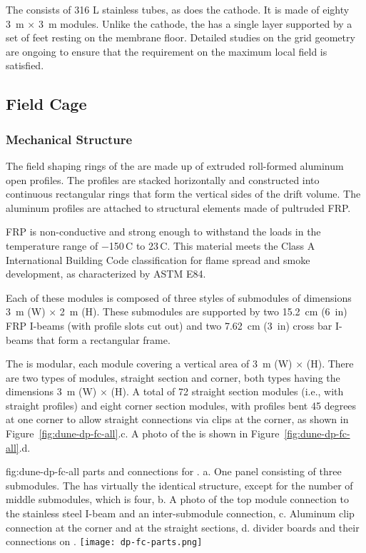 The  consists of 316 L stainless tubes, as does the cathode. It is made of eighty \SI{3}{\m} $\times$ \SI{3}{\m} modules. Unlike the cathode, the  has a single layer supported by a set of feet resting on the membrane floor.
Detailed studies on the grid geometry are ongoing to ensure that the requirement on the maximum local field is satisfied.

\subsection{Field Cage}

\subsubsection{Mechanical Structure}
The field shaping rings of the  are made up of extruded roll-formed aluminum open profiles.  
The profiles are stacked horizontally and constructed into continuous rectangular rings that form the vertical sides of the drift volume. The aluminum profiles are attached to structural elements made of pultruded  FRP. 

FRP is non-conductive and strong enough to withstand the  loads in the temperature range of \num{-150}\,C to \num{23}\,C.
This material meets the  Class A International Building Code classification for flame spread and smoke development, 
as characterized by ASTM E84. 


Each of these modules is composed of three 
styles of submodules of dimensions \SI{3}{\m} (W) $\times$ \SI{2}{\m} (H). These submodules are supported by two \SI{15.2}{cm} (\SI{6}{in}) FRP I-beams (with profile slots cut out) and two \SI{7.62}{cm} (\SI{3}{in}) cross bar I-beams that form a rectangular frame.  


The  is modular, each module covering a vertical area of \SI{3}{\m} (W) $\times$ \tpcheight (H). 
There are two types of modules, straight section and corner, both types having the dimensions \SI{3}{\m} (W) $\times$ \tpcheight (H). A total of \num{72} straight section modules (i.e., with straight profiles) and eight corner section modules, with profiles bent \num{45} degrees at one corner to allow straight connections via clips at the corner, as shown in Figure~\ref{fig:dune-dp-fc-all}.c.  A photo of the   is shown in Figure~\ref{fig:dune-dp-fc-all}.d.

\begin{dunefigure}{fig:dune-dp-fc-all}
{ parts and connections for .  a. One   panel consisting of three submodules.  The  has virtually the identical structure, except for the number of middle submodules, which is four, b. A photo of the top module connection to the stainless steel I-beam and an inter-submodule connection, c. Aluminum clip connection at the corner and at the straight sections, d.  divider boards and their connections on  . }
\texttt{[image: dp-fc-parts.png]}
\end{dunefigure}


